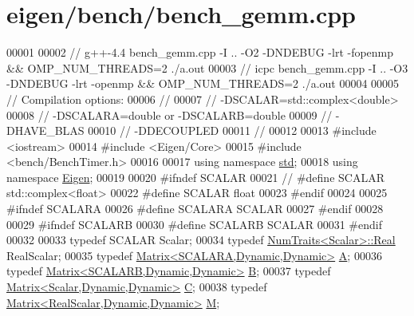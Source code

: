 \hypertarget{eigen_2bench_2bench__gemm_8cpp_source}{}\section{eigen/bench/bench\+\_\+gemm.cpp}
\label{eigen_2bench_2bench__gemm_8cpp_source}

\begin{DoxyCode}
00001 
00002 \textcolor{comment}{// g++-4.4 bench\_gemm.cpp -I .. -O2 -DNDEBUG -lrt -fopenmp && OMP\_NUM\_THREADS=2  ./a.out}
00003 \textcolor{comment}{// icpc bench\_gemm.cpp -I .. -O3 -DNDEBUG -lrt -openmp  && OMP\_NUM\_THREADS=2  ./a.out}
00004 
00005 \textcolor{comment}{// Compilation options:}
00006 \textcolor{comment}{// }
00007 \textcolor{comment}{// -DSCALAR=std::complex<double>}
00008 \textcolor{comment}{// -DSCALARA=double or -DSCALARB=double}
00009 \textcolor{comment}{// -DHAVE\_BLAS}
00010 \textcolor{comment}{// -DDECOUPLED}
00011 \textcolor{comment}{//}
00012 
00013 \textcolor{preprocessor}{#include <iostream>}
00014 \textcolor{preprocessor}{#include <Eigen/Core>}
00015 \textcolor{preprocessor}{#include <bench/BenchTimer.h>}
00016 
00017 \textcolor{keyword}{using namespace }\hyperlink{namespacestd}{std};
00018 \textcolor{keyword}{using namespace }\hyperlink{namespace_eigen}{Eigen};
00019 
00020 \textcolor{preprocessor}{#ifndef SCALAR}
00021 \textcolor{comment}{// #define SCALAR std::complex<float>}
00022 \textcolor{preprocessor}{#define SCALAR float}
00023 \textcolor{preprocessor}{#endif}
00024 
00025 \textcolor{preprocessor}{#ifndef SCALARA}
00026 \textcolor{preprocessor}{#define SCALARA SCALAR}
00027 \textcolor{preprocessor}{#endif}
00028 
00029 \textcolor{preprocessor}{#ifndef SCALARB}
00030 \textcolor{preprocessor}{#define SCALARB SCALAR}
00031 \textcolor{preprocessor}{#endif}
00032 
00033 \textcolor{keyword}{typedef} SCALAR Scalar;
00034 \textcolor{keyword}{typedef} \hyperlink{group___core___module_struct_eigen_1_1_num_traits}{NumTraits<Scalar>::Real} RealScalar;
00035 \textcolor{keyword}{typedef} \hyperlink{group___core___module_class_eigen_1_1_matrix}{Matrix<SCALARA,Dynamic,Dynamic>} \hyperlink{group___core___module_class_eigen_1_1_matrix}{A};
00036 \textcolor{keyword}{typedef} \hyperlink{group___core___module_class_eigen_1_1_matrix}{Matrix<SCALARB,Dynamic,Dynamic>} \hyperlink{group___core___module_class_eigen_1_1_matrix}{B};
00037 \textcolor{keyword}{typedef} \hyperlink{group___core___module}{Matrix<Scalar,Dynamic,Dynamic>} \hyperlink{group___core___module_class_eigen_1_1_matrix}{C};
00038 \textcolor{keyword}{typedef} \hyperlink{group___core___module_class_eigen_1_1_matrix}{Matrix<RealScalar,Dynamic,Dynamic>} \hyperlink{group___core___module_class_eigen_1_1_matrix}{M};

\end{DoxyCode}
